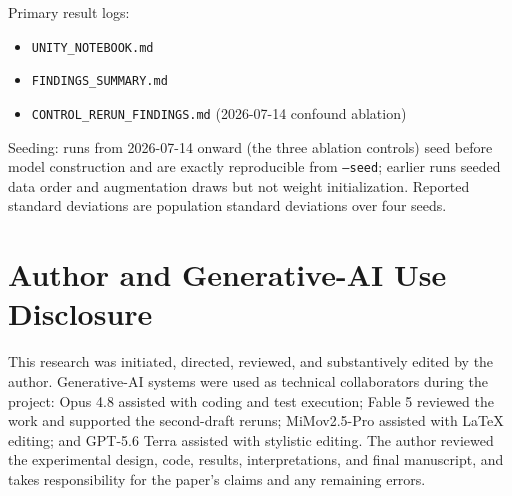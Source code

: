 \documentclass[11pt]{article}
\begin{document}
Primary result logs:
\begin{itemize}
  \item \texttt{UNITY\_NOTEBOOK.md}
  \item \texttt{FINDINGS\_SUMMARY.md}
  \item \texttt{CONTROL\_RERUN\_FINDINGS.md} (2026-07-14 confound ablation)
\end{itemize}

Seeding: runs from 2026-07-14 onward (the three ablation controls) seed before model construction and are exactly reproducible from \texttt{--seed}; earlier runs seeded data order and augmentation draws but not weight initialization. Reported standard deviations are population standard deviations over four seeds.

\section*{Author and Generative-AI Use Disclosure}

This research was initiated, directed, reviewed, and substantively edited by the author. Generative-AI systems were used as technical collaborators during the project: Opus 4.8 assisted with coding and test execution; Fable 5 reviewed the work and supported the second-draft reruns; MiMov2.5-Pro assisted with \LaTeX{} editing; and GPT-5.6 Terra assisted with stylistic editing. The author reviewed the experimental design, code, results, interpretations, and final manuscript, and takes responsibility for the paper's claims and any remaining errors.



\end{document}
